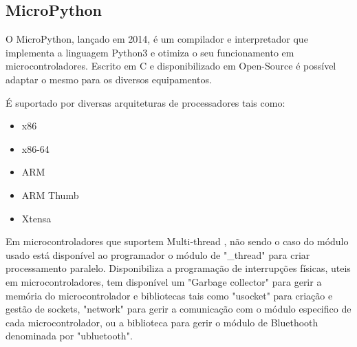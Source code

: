 \subsection {MicroPython}
\par O MicroPython\cite{MicroPython}, lançado em 2014, é um compilador e interpretador que implementa a linguagem Python3 e otimiza o seu funcionamento em microcontroladores. Escrito em C e disponibilizado em Open-Source é possível adaptar o mesmo para os diversos equipamentos. \par
É suportado por diversas arquiteturas de processadores tais como:
\par
\begin{itemize}
\item x86
\item x86-64
\item ARM
\item ARM Thumb
\item Xtensa
\end{itemize}
\par
Em microcontroladores que suportem Multi-thread , não sendo o caso do módulo usado está disponível ao programador o módulo de "\_thread" para criar processamento paralelo. Disponibiliza a programação de interrupções físicas, uteis em microcontroladores,  tem disponível um "Garbage collector" para gerir a memória do microcontrolador e bibliotecas tais como "usocket" para criação e gestão de sockets, "network" para gerir a comunicação com o módulo especifico de cada microcontrolador, ou a biblioteca para gerir o módulo de Bluethooth denominada por "ubluetooth"\cite{micropython_lib}. 

